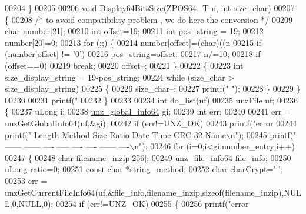 \begin{DoxyCode}
{{00204 \}
00205 
00206 \textcolor{keywordtype}{void} Display64BitsSize(ZPOS64\_T n, \textcolor{keywordtype}{int} size\_char)
00207 \{
00208   \textcolor{comment}{/* to avoid compatibility problem , we do here the conversion */}
00209   \textcolor{keywordtype}{char} number[21];
00210   \textcolor{keywordtype}{int} offset=19;
00211   \textcolor{keywordtype}{int} pos\_string = 19;
00212   number[20]=0;
00213   \textcolor{keywordflow}{for} (;;) \{
00214       number[offset]=(char)((n%
00215       \textcolor{keywordflow}{if} (number[offset] != \textcolor{charliteral}{'0'})
00216           pos\_string=offset;
00217       n/=10;
00218       \textcolor{keywordflow}{if} (offset==0)
00219           \textcolor{keywordflow}{break};
00220       offset--;
00221   \}
00222   \{
00223       \textcolor{keywordtype}{int} size\_display\_string = 19-pos\_string;
00224       \textcolor{keywordflow}{while} (size\_char > size\_display\_string)
00225       \{
00226           size\_char--;
00227           printf(\textcolor{stringliteral}{" "});
00228       \}
00229   \}
00230 
00231   printf(\textcolor{stringliteral}{"%
00232 \}
00233 
00234 \textcolor{keywordtype}{int} do\_list(uf)
00235     unzFile uf;
00236 \{
00237     uLong i;
00238     \hyperlink{structunz__global__info64__s}{unz\_global\_info64} gi;
00239     \textcolor{keywordtype}{int} err;
00240 
00241     err = unzGetGlobalInfo64(uf,&gi);
00242     \textcolor{keywordflow}{if} (err!=UNZ\_OK)
00243         printf(\textcolor{stringliteral}{"error %
00244     printf(\textcolor{stringliteral}{"  Length  Method     Size Ratio   Date    Time   CRC-32     Name\(\backslash\)n"});
00245     printf(\textcolor{stringliteral}{"  ------  ------     ---- -----   ----    ----   ------     ----\(\backslash\)n"});
00246     \textcolor{keywordflow}{for} (i=0;i<gi.number\_entry;i++)
00247     \{
00248         \textcolor{keywordtype}{char} filename\_inzip[256];
00249         \hyperlink{structunz__file__info64__s}{unz\_file\_info64} file\_info;
00250         uLong ratio=0;
00251         \textcolor{keyword}{const} \textcolor{keywordtype}{char} *string\_method;
00252         \textcolor{keywordtype}{char} charCrypt=\textcolor{charliteral}{' '};
00253         err = unzGetCurrentFileInfo64(uf,&file\_info,filename\_inzip,\textcolor{keyword}{sizeof}(filename\_inzip),NULL,0,NULL,0);
00254         \textcolor{keywordflow}{if} (err!=UNZ\_OK)
00255         \{
00256             printf(\textcolor{stringliteral}{"error %
}}}}}
\end{DoxyCode}
